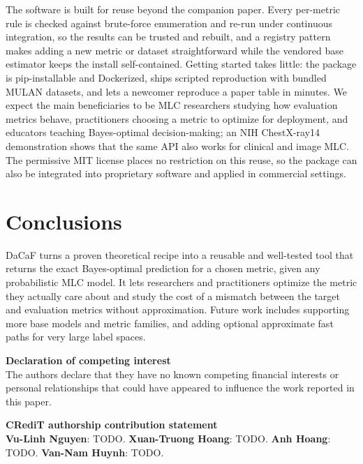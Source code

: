 \documentclass[11pt, letterpaper]{article}
\begin{document}
The software is built for reuse beyond the companion paper. Every per-metric rule is checked
against brute-force enumeration and re-run under continuous integration, so the results can
be trusted and rebuilt, and a registry pattern makes adding a new metric or dataset
straightforward while the vendored base estimator keeps the install self-contained.
Getting started takes little: the package is pip-installable and Dockerized, ships scripted
reproduction with bundled MULAN datasets, and lets a newcomer reproduce a paper table in
minutes. We expect the main beneficiaries to be MLC researchers studying how evaluation
metrics behave, practitioners choosing a metric to optimize for deployment, and educators
teaching Bayes-optimal decision-making; an NIH ChestX-ray14 demonstration shows that the
same API also works for clinical and image MLC. The permissive MIT license places no
restriction on this reuse, so the package can also be integrated into proprietary software
and applied in commercial settings.

\section{Conclusions}\label{sec:conclusions}
DaCaF turns a proven theoretical recipe into a reusable and well-tested tool that returns
the exact Bayes-optimal prediction for a chosen metric, given any probabilistic MLC model.
It lets researchers and practitioners optimize the metric they actually care about and study
the cost of a mismatch between the target and evaluation metrics without approximation. Future work includes
supporting more base models and metric families, and adding optional approximate fast paths
for very large label spaces.

\vskip0.3cm
\noindent\textbf{Declaration of competing interest}\\
The authors declare that they have no known competing financial interests or personal
relationships that could have appeared to influence the work reported in this paper.
\vskip0.3cm

\noindent\textbf{CRediT authorship contribution statement}\\
\textbf{Vu-Linh Nguyen}: TODO. \textbf{Xuan-Truong Hoang}: TODO.
\textbf{Anh Hoang}: TODO. \textbf{Van-Nam Huynh}: TODO.
\vskip0.3cm
\end{document}
